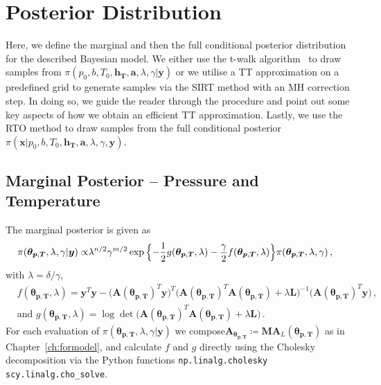 \section{Posterior Distribution}
Here, we define the marginal and then the full conditional posterior distribution for the described Bayesian model.
We either use the t-walk algorithm~\cite{christen2010general} to draw samples from $\pi(p_0,b,T_0,\bm{h_T},\bm{a} ,\lambda, \gamma| \bm{y})$ or we utilise a TT approximation on a predefined grid to generate samples via the SIRT method with an MH correction step.
In doing so, we guide the reader through the procedure and point out some key aspects of how we obtain an efficient TT approximation.
Lastly, we use the RTO method to draw samples from the full conditional posterior $\pi(\bm{x}|p_0,b,T_0,\bm{h_T},\bm{a} ,\lambda, \gamma, \bm{y})$.



\subsection{Marginal Posterior -- Pressure and Temperature}

The marginal posterior is given as
\begin{align}
	\pi( \bm{\theta}_{\bm{p}, \bm{T}},\lambda,\gamma  | \bm{y}) \propto &  \lambda^{n/2} \gamma^{m/2}   \exp{ \Bigl\{ - \frac{1}{2} g ( \bm{\theta}_{\bm{p}, \bm{T}},\lambda) - \frac{\gamma}{2} f (\bm{\theta}_{\bm{p}, \bm{T}},\lambda) \Bigr\}} \pi(\bm{\theta}_{\bm{p}, \bm{T}},\lambda,\gamma ) \, ,
	\label{eq:MargPostFull}
\end{align}
with $\lambda= \delta / \gamma$,
\begin{subequations}
	\label{eq:fandgTrue}
	\begin{align}
		&f ( \bm{\theta}_{\bm{p}, \bm{T}},\lambda) = \bm{y}^T \bm{y} - \big(\bm{A}(\bm{\theta}_{\bm{p}, \bm{T}})^T \bm{y}\big)^T \big(\bm{A}(\bm{\theta}_{\bm{p}, \bm{T}})^T  \bm{A}(\bm{\theta}_{\bm{p}, \bm{T}}) + \lambda \bm{L}\big)^{-1} \big(\bm{A}(\bm{\theta}_{\bm{p}, \bm{T}})^T \bm{y}\big)  \label{eq:fFullAppl} \, ,  \\
		&\text{and } g(\bm{\theta}_{\bm{p}, \bm{T}},\lambda) = \log \det \big(\bm{A}(\bm{\theta}_{\bm{p}, \bm{T}})^T  \bm{A}(\bm{\theta}_{\bm{p}, \bm{T}}) + \lambda \bm{L}\big) \label{eq:gFullAppl} \, .
	\end{align}
\end{subequations}
For each evaluation of $\pi( \bm{\theta}_{\bm{p}, \bm{T}},\lambda,\gamma  | \bm{y})$ we compose$\bm{A}_{\bm{\theta}_{\bm{p}, \bm{T}}} \coloneqq \bm{M}\bm{A}_L(\bm{\theta}_{\bm{p}, \bm{T}})$ as in Chapter~\ref{ch:formodel}, and calculate $f$ and $g$ directly using the Cholesky decomposition via the Python functions \texttt{np.linalg.cholesky} \texttt{scy.linalg.cho\_solve}.


